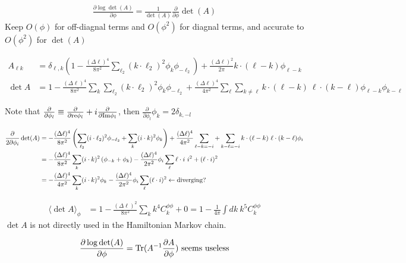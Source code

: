\documentclass[noinfoline]{imsart}
\begin{document}
\begin{align}
  \frac{\partial \log \det(A)}{\partial \phi} = \frac{1}{\det(A)}   \frac{\partial}{\partial \phi}\det (A)
\end{align}
Keep $O(\phi)$ for off-diagnal terms and $O(\phi^2)$ for diagnal terms, and accurate to $O(\phi^2)$ for $\det (A)$

\begin{align}
A_{\ell k}
&= \delta_{\ell,k} \left(1-\frac{(\Delta\ell)^4}{8\pi^2}\sum_{\ell_2}   (k\cdot\ell_2)^2
  \phi_{k}\phi_{-\ell_2} \right) + \frac{ (\Delta\ell)^2}{2\pi} k\cdot(\ell-k)\phi_{\ell-k}\\
\det A
&=1-\frac{(\Delta\ell)^4}{8\pi^2}\sum_k\sum_{\ell_2}   (k\cdot\ell_2)^2 \phi_{k}\phi_{-\ell_2}
+ \frac{ (\Delta\ell)^4}{4\pi^2} \sum_\ell \sum_{k\neq\ell} k\cdot(\ell-k)\ \ell\cdot(k-\ell)\phi_{\ell-k}\phi_{k-\ell}\nonumber
\end{align}

Note that $\frac{\partial}{\partial \phi_l}
\equiv \frac{\partial}{\partial{\rm re} \phi_l} +i\frac{\partial}{\partial{\rm Im} \phi_l} $, then
$\frac{\partial}{\partial \phi_l} \phi_{k} = 2 \delta_{k,-l}$

\begin{align}
\frac{\partial}{2\partial \phi_i}\det (A)
&=-\frac{(\Delta\ell)^4}{8\pi^2} \left(\sum_{\ell_2}   (i\cdot\ell_2)^2 \phi_{-\ell_2}
+\sum_{k}   (i\cdot k)^2 \phi_{k}\right)
+\frac{ (\Delta\ell)^4}{4\pi^2} \sum_{\ell-k=-i}+\sum_{k-\ell=-i} k\cdot(\ell-k)\ \ell\cdot(k-\ell)\phi_{i}\nonumber\\
&=-\frac{(\Delta\ell)^4}{8\pi^2} \sum_{k} (i\cdot k)^2 \left(\phi_{-k}+\phi_{k}\right)
-\frac{ (\Delta\ell)^4}{2\pi^2}\phi_{i} \sum_\ell \ell\cdot i \ i^2 + (\ell\cdot i)^2\nonumber\\
&=-\frac{(\Delta\ell)^4}{4\pi^2} \sum_{k} (i\cdot k)^2 \phi_{k}
-\frac{ (\Delta\ell)^4}{2\pi^2}\phi_{i} \sum_\ell  (\ell\cdot i)^2 \leftarrow {\rm diverging} ?
\end{align}

\begin{align}
\langle \det A \rangle_{\phi}
&= 1-\frac{(\Delta\ell)^2}{8\pi^2}\sum_k  k^4 C_k^{\phi\phi}+0 = 1 -\frac{1}{4\pi} \int dk\ k^5  C_k^{\phi\phi}
\end{align}
$\det A$ is not directly used in the Hamiltonian Markov chain.

\begin{align}
  \frac{\partial \log \det(A)}{\partial \phi} = \mathrm{Tr}(A^{-1}   \frac{\partial A}{\partial \phi} )\ {\rm seems \ useless}
\end{align}
\end{document}
